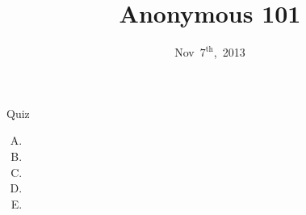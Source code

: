 \documentclass{beamer}
\title{Anonymous 101}
\date{Nov~$7^{\text{th}}$,~2013}
\begin{document}
\begin{frame}
\titlepage
\end{frame}

\begin{frame}{Quiz}
\begin{enumerate}[(A)]
\item<1>
\item<1-2>
\item<1>
\item<1>
\item<1>
\end{enumerate}
\end{frame}
\end{document}
